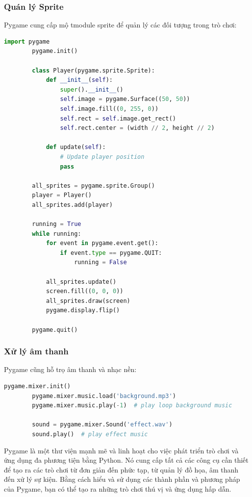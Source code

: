 \documentclass[a4paper]{article}
\begin{document}
\subsubsection{Quán lý Sprite}
Pygame cung cấp mộ tmodule sprite để quản lý các đối tượng trong trò chơi:
\begin{mdframed}[hidealllines=true,backgroundcolor=magenta!10]
	\begin{lstlisting}[language=Python]
		import pygame
        pygame.init()

        class Player(pygame.sprite.Sprite):
            def __init__(self):
                super().__init__()
                self.image = pygame.Surface((50, 50))
                self.image.fill((0, 255, 0))
                self.rect = self.image.get_rect()
                self.rect.center = (width // 2, height // 2)

            def update(self):
                # Update player position
                pass

        all_sprites = pygame.sprite.Group()
        player = Player()
        all_sprites.add(player)

        running = True
        while running:
            for event in pygame.event.get():
                if event.type == pygame.QUIT:
                    running = False

            all_sprites.update()
            screen.fill((0, 0, 0))
            all_sprites.draw(screen)
            pygame.display.flip()

        pygame.quit()
	\end{lstlisting}
	\end{mdframed}
\subsubsection{Xử lý âm thanh}
Pygame cũng hỗ trọ âm thanh và nhạc nền:
\begin{mdframed}[hidealllines=true,backgroundcolor=magenta!10]
	\begin{lstlisting}[language=Python]
		pygame.mixer.init()
        pygame.mixer.music.load('background.mp3')
        pygame.mixer.music.play(-1)  # play loop background music

        sound = pygame.mixer.Sound('effect.wav')
        sound.play()  # play effect music
	\end{lstlisting}
	\end{mdframed}
 Pygame là một thư viện mạnh mẽ và linh hoạt cho việc phát triển trò chơi và ứng dụng đa phương tiện bằng Python. Nó cung cấp tất cả các công cụ cần thiết để tạo ra các trò chơi từ đơn giản đến phức tạp, từ quản lý đồ họa, âm thanh đến xử lý sự kiện. Bằng cách hiểu và sử dụng các thành phần và phương pháp của Pygame, bạn có thể tạo ra những trò chơi thú vị và ứng dụng hấp dẫn.
\newpage
\end{document}

